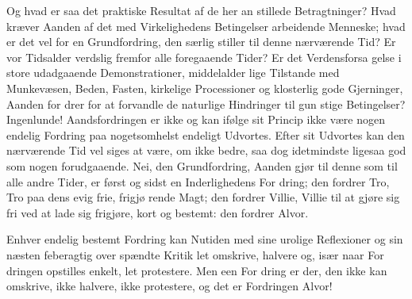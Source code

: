 \documentclass[12pt]{book}
\begin{document}
Og hvad er saa det praktiske Resultat af de her an\-%
stillede Betragtninger? Hvad kræver Aanden af det
med Virkelighedens Betingelser arbeidende Menneske;
hvad er det vel for en Grundfordring, den særlig stiller
til denne nærværende Tid? Er vor Tidsalder verdslig
fremfor alle foregaaende Tider? Er det Verdensforsa\-%
gelse i store udadgaaende Demonstrationer, middelalder\-%
lige Tilstande med Munkevæsen, Beden, Fasten, kirkelige
Processioner og klosterlig gode Gjerninger, Aanden for\-%
drer for at forvandle de naturlige Hindringer til gun\-%
stige Betingelser? Ingenlunde! Aandsfordringen er ikke og
kan ifølge sit Princip ikke være nogen endelig Fordring paa
nogetsomhelst endeligt Udvortes. Efter sit Udvortes kan
den nærværende Tid vel siges at være, om ikke bedre, saa
dog idetmindste ligesaa god som nogen forudgaaende.
Nei, den Grundfordring, Aanden gjør til denne som til
alle andre Tider, er først og sidst en Inderlighedens For\-%
dring; den fordrer Tro, Tro paa dens evig frie, frigjø\-%
rende Magt; den fordrer Villie, Villie til at gjøre sig fri
ved at lade sig frigjøre, kort og bestemt: den fordrer
Alvor.

Enhver endelig bestemt Fordring kan Nutiden med
sine urolige Reflexioner og sin næsten feberagtig over\-%
spændte Kritik let omskrive, halvere og, især naar For\-%
dringen opstilles enkelt, let protestere. Men een For\-%
dring er der, den ikke kan omskrive, ikke halvere, ikke
protestere, og det er Fordringen Alvor!
\end{document}
